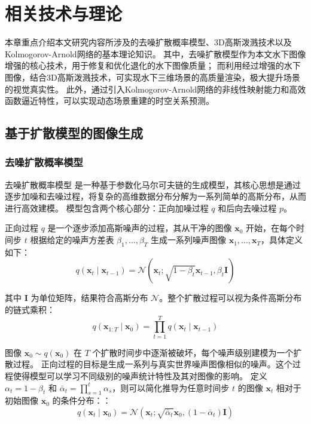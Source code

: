 
\chapter{相关技术与理论}
本章重点介绍本文研究内容所涉及的去噪扩散概率模型、3D高斯泼溅技术以及Kolmogorov-Arnold网络的基本理论知识。
其中，去噪扩散模型作为本文水下图像增强的核心技术，用于修复和优化退化的水下图像质量；
而利用经过增强的水下图像，结合3D高斯泼溅技术，可实现水下三维场景的高质量渲染，极大提升场景的视觉真实性。
此外，通过引入Kolmogorov-Arnold网络的非线性映射能力和高效函数逼近特性，可以实现动态场景重建的时空关系预测。

\section{基于扩散模型的图像生成}

\subsection{去噪扩散概率模型}
去噪扩散概率模型\cite{pre_ddpm}\cite{ddpm} 是一种基于参数化马尔可夫链的生成模型，其核心思想是通过逐步加噪和去噪过程，将复杂的高维数据分布分解为一系列简单的高斯分布，从而进行高效建模。
模型包含两个核心部分：正向加噪过程 $q$ 和后向去噪过程 $p$。

正向过程 $q$ 是一个逐步添加高斯噪声的过程，其从干净的图像 $\mathbf{x}_0$ 开始，在每个时间步 $t$ 根据给定的噪声方差表 $\beta_1, \dots, \beta_T$ 生成一系列噪声图像 $\mathbf{x}_1, \dots, \mathbf{x}_T$，具体定义如下：
\begin{equation}
    \label{eq:q_1step}
    q\left(\mathbf{x}_t \mid \mathbf{x}_{t-1}\right)=\mathcal{N}\left(\mathbf{x}_t ; \sqrt{1-\beta_t} \mathbf{x}_{t-1}, \beta_t \mathbf{I}\right)
\end{equation}

其中 $\mathbf{I}$ 为单位矩阵，结果符合高斯分布 $\mathcal{N}$。整个扩散过程可以视为条件高斯分布的链式乘积：
\begin{equation}
    q\left(\mathbf{x}_{1: T} \mid \mathbf{x}_0\right)=\prod_{t=1}^T q\left(\mathbf{x}_t \mid \mathbf{x}_{t-1}\right)
\end{equation}

图像 $\mathbf{x}_0 \sim q\left(\mathbf{x}_0\right)$ 在 $T$ 个扩散时间步中逐渐被破坏，每个噪声级别建模为一个扩散过程。
正向过程的目标是生成一系列与真实世界噪声图像相似的噪声。这个过程使得模型可以学习不同级别的噪声统计特性及其对图像的影响。
定义 $\alpha_t=1-\beta_t$ 和  $\bar{\alpha}_t = \prod_{s=1}^t \alpha_s$，则可以简化推导为任意时间步 $t$ 的图像 $\mathbf{x}_t$ 相对于初始图像 $\mathbf{x}_0$ 的条件分布：：
\begin{equation}
    \label{eq:q}
q\left(\mathbf{x}_t \mid \mathbf{x}_0\right)=\mathcal{N}\left(\mathbf{x}_t ; \sqrt{\bar{\alpha}_t} \mathbf{x}_0,\left(1-\bar{\alpha}_t\right) \mathbf{I}\right)
\end{equation}

